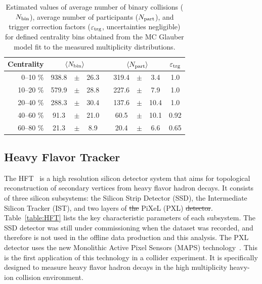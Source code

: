 \documentclass[%
 reprint,	
showpacs,
 amsmath,amssymb,
 aps,
 prc,
]{revtex4-1}
\providecommand{\DIFaddtex}[1]{{\protect\color{blue}\uwave{#1}}} %
\providecommand{\DIFdeltex}[1]{{\protect\color{red}\sout{#1}}}                      %
\providecommand{\DIFaddbegin}{} %
\providecommand{\DIFaddend}{} %
\providecommand{\DIFdelbegin}{} %
\providecommand{\DIFdelend}{} %
\providecommand{\DIFaddendFL}{} %
\providecommand{\DIFadd}[1]{\texorpdfstring{\DIFaddtex{#1}}{#1}} %
\providecommand{\DIFdel}[1]{\texorpdfstring{\DIFdeltex{#1}}{}} %
\begin{document}
\begin{table}[t]
{\caption{Estimated values of average number of binary collisions ($N_{\rm bin}$), average number of participants ($N_{\rm part}$), and trigger correction factors ($\varepsilon_{\rm trg}$, uncertainties negligible) for defined centrality bins obtained from the MC Glauber model fit to the measured multiplicity distributions.}
\begin{tabular}{rcccccccc} \hline \hline
\hspace{1cm}Centrality\hspace{1cm} & \multicolumn{3}{c}{$\langle N_{\rm bin}\rangle$} & \hspace{1cm} & \multicolumn{3}{c}{$\langle N_{\rm part}\rangle$} & \hspace{1cm}$\varepsilon_{\rm trg}$\hspace{1cm} \\ \hline
0--10 \%\hspace{1cm}      & 938.8 & $\pm$ & 26.3 & & 319.4 & $\pm$ & 3.4  & 1.0 \\
10--20 \%\hspace{1cm}     & 579.9 & $\pm$ & 28.8 & & 227.6 & $\pm$ & 7.9  & 1.0 \\
20--40 \%\hspace{1cm}     & 288.3 & $\pm$ & 30.4 & & 137.6 & $\pm$ & 10.4 & 1.0 \\
40--60 \%\hspace{1cm}     & 91.3  & $\pm$ & 21.0 & & 60.5  & $\pm$ & 10.1 & 0.92 \\
60--80 \%\hspace{1cm}     & 21.3  & $\pm$ & 8.9  & & 20.4  & $\pm$ & 6.6  & 0.65 \\ \hline \hline
\end{tabular}
\label{table:ccentrality}
}
\DIFaddendFL \end{table}

\subsection{Heavy Flavor Tracker}
\label{dataset:hft}

The HFT~\cite{Contin:2017mck} is a high resolution silicon detector system that aims for topological reconstruction of secondary vertices from heavy flavor hadron decays. It consists of three silicon subsystems: the Silicon Strip Detector (SSD), the Intermediate Silicon Tracker (IST), and two layers of \DIFdelbegin \DIFdel{the }\DIFdelend PiXeL (PXL) \DIFdelbegin \DIFdel{detector}\DIFdelend \DIFaddbegin \DIFadd{detectors}\DIFaddend . 
Table~\ref{table:HFT} lists the key characteristic parameters of each subsystem. The SSD detector was still under commissioning when the dataset was recorded, and therefore is not used in the offline data production and this analysis.
The PXL detector uses the new Monolithic Active Pixel Sensors (MAPS) technology~\cite{Contin:2017mck}. This is the first application of this technology in a collider experiment. It is specifically designed to measure heavy flavor hadron decays in the high multiplicity heavy-ion collision environment.
\end{document}

